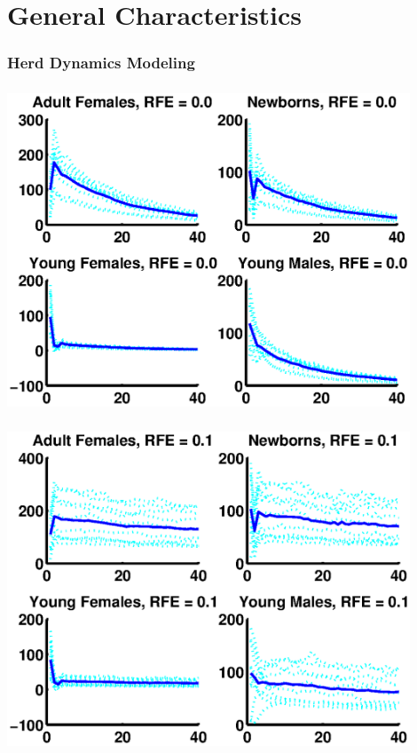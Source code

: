 \documentclass[mathserif]{beamer}
\begin{document}
\section{General Characteristics}

\begin{frame}
\frametitle{Herd Dynamics Modeling}
\tableofcontents[currentsection]
\end{frame}

\begin{frame}
\begin{center}
\frametitle{\insertsection}
\includegraphics[width=0.9\textwidth]{general0}
\end{center}
\end{frame}

\begin{frame}
\begin{center}
\frametitle{\insertsection}
\includegraphics[width=0.9\textwidth]{general1}
\end{center}
\end{frame}
\end{document}
